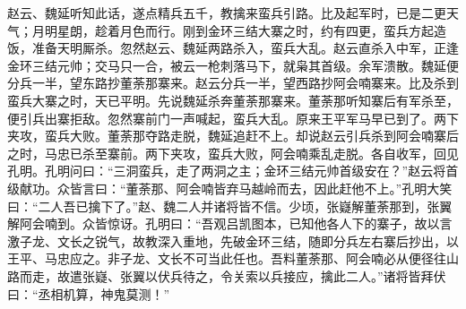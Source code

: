 赵云、魏延听知此话，遂点精兵五千，教擒来蛮兵引路。比及起军时，已是二更天气；月明星朗，趁着月色而行。刚到金环三结大寨之时，约有四更，蛮兵方起造饭，准备天明厮杀。忽然赵云、魏延两路杀入，蛮兵大乱。赵云直杀入中军，正逢金环三结元帅；交马只一合，被云一枪刺落马下，就枭其首级。余军溃散。魏延便分兵一半，望东路抄董荼那寨来。赵云分兵一半，望西路抄阿会喃寨来。比及杀到蛮兵大寨之时，天已平明。先说魏延杀奔董荼那寨来。董荼那听知寨后有军杀至，便引兵出寨拒敌。忽然寨前门一声喊起，蛮兵大乱。原来王平军马早已到了。两下夹攻，蛮兵大败。董荼那夺路走脱，魏延追赶不上。却说赵云引兵杀到阿会喃寨后之时，马忠已杀至寨前。两下夹攻，蛮兵大败，阿会喃乘乱走脱。各自收军，回见孔明。孔明问曰：“三洞蛮兵，走了两洞之主；金环三结元帅首级安在？”赵云将首级献功。众皆言曰：“董荼那、阿会喃皆弃马越岭而去，因此赶他不上。”孔明大笑曰：“二人吾已擒下了。”赵、魏二人并诸将皆不信。少顷，张嶷解董荼那到，张翼解阿会喃到。众皆惊讶。孔明曰：“吾观吕凯图本，已知他各人下的寨子，故以言激子龙、文长之锐气，故教深入重地，先破金环三结，随即分兵左右寨后抄出，以王平、马忠应之。非子龙、文长不可当此任也。吾料董荼那、阿会喃必从便径往山路而走，故遣张嶷、张翼以伏兵待之，令关索以兵接应，擒此二人。”诸将皆拜伏曰：“丞相机算，神鬼莫测！”

